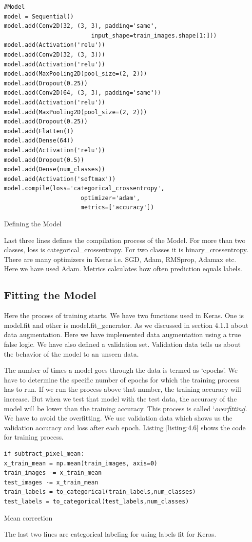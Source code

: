 \begin{listing}[H]
    \begin{verbatim}
#Model
model = Sequential()
model.add(Conv2D(32, (3, 3), padding='same',
                         input_shape=train_images.shape[1:]))
model.add(Activation('relu'))
model.add(Conv2D(32, (3, 3)))
model.add(Activation('relu'))
model.add(MaxPooling2D(pool_size=(2, 2)))
model.add(Dropout(0.25))   
model.add(Conv2D(64, (3, 3), padding='same'))
model.add(Activation('relu'))
model.add(MaxPooling2D(pool_size=(2, 2)))
model.add(Dropout(0.25))      
model.add(Flatten())     
model.add(Dense(64))
model.add(Activation('relu'))
model.add(Dropout(0.5))      
model.add(Dense(num_classes))
model.add(Activation('softmax'))      
model.compile(loss='categorical_crossentropy',
                      optimizer='adam',
                      metrics=['accuracy'])
    \end{verbatim}
    \caption{Defining the Model}
\label{listing:4.5}
\end{listing}
Last three lines defines the compilation process of the Model. 
For more than two classes, loss is categorical\_crossentropy. For two
classes it is binary\_crossentropy. There are many optimizers in Keras i.e.
SGD, Adam, RMSprop, Adamax etc. Here we have used Adam. Metrics calculates how
often prediction equals labels.
\subsection{Fitting the Model}
Here the process of training starts. We have two functions used in Keras. One
is model.fit and other is model.fit\_generator. As we discussed in section 4.1.1
about data augmentation. Here we have implemented data augmentation using a true false
logic. We have also defined a validation set. Validation data tells us about the
behavior of the model to an unseen data.

The number of times a model goes through the data is termed as `epochs'.
We have to determine the specific number of epochs for which the training process has to
run. If we run the process above that number, the training accuracy will
increase. But when we test that model with the test data, the accuracy of the model
will be lower than the training accuracy. This process is called `\textit{overfitting}'.
We have to avoid the overfitting. We use validation data which shows us the validation accuracy
and loss after each epoch. Listing \ref{listing:4.6} shows the code for training process.
\begin{listing}[H]
    \begin{verbatim}
if subtract_pixel_mean:
x_train_mean = np.mean(train_images, axis=0)
train_images -= x_train_mean
test_images -= x_train_mean
train_labels = to_categorical(train_labels,num_classes)
test_labels = to_categorical(test_labels,num_classes)
    \end{verbatim}
    \caption{Mean correction}
\label{listing:4.4}
\end{listing}
\noindent The last two lines are categorical labeling for using labels fit for Keras.
